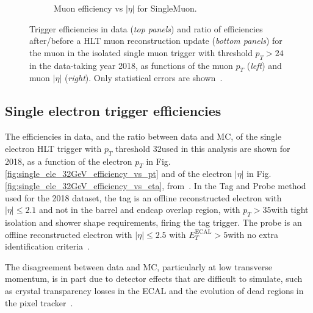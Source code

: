 \begin{figure}[ht]
\begin{subfigure}{0.45\textwidth}
        \caption{Muon efficiency vs $|\eta|$ for SingleMuon.}
        \label{fig:single_muon_24GeV_efficiency_vs_eta}
    \end{subfigure}
    \caption[Trigger efficiencies in data (\textit{top panels}) and ratio of efficiencies after/before a HLT muon reconstruction update (\textit{bottom panels}) for the muon in the isolated single muon trigger with threshold $p_{T} > 24$\GeV in the data-taking year 2018, as functions of the muon $p_{T}$ (\textit{left}) and muon $|\eta|$ (\textit{right}).]{Trigger efficiencies in data (\textit{top panels}) and ratio of efficiencies after/before a HLT muon reconstruction update (\textit{bottom panels}) for the muon in the isolated single muon trigger with threshold $p_{T} > 24$\GeV in the data-taking year 2018, as functions of the muon $p_{T}$ (\textit{left}) and muon $|\eta|$ (\textit{right}). Only statistical errors are shown~\cite{CMS-DP-2018-034}.} 
\end{figure}

\subsection{Single electron trigger efficiencies}

The efficiencies in data, and the ratio between data and MC, of the single electron HLT trigger with $p_{T}$ threshold 32\GeV used in this analysis are shown for 2018, as a function of the electron $p_{T}$ in Fig. \ref{fig:single_ele_32GeV_efficiency_vs_pt} and of the electron $|\eta|$ in Fig. \ref{fig:single_ele_32GeV_efficiency_vs_eta}, from~\cite{CMS-DP-2020-016}. In the Tag and Probe method used for the 2018 dataset, the tag is an offline reconstructed electron with $|\eta| \leq 2.1$ and not in the barrel and endcap overlap region, with $p_{T} > 35$\GeV with tight isolation and shower shape requirements, firing the tag trigger. The probe is an offline reconstructed electron with $|\eta| \leq 2.5$ with $E_T^\text{ECAL} > 5$\GeV with no extra identification criteria~\cite{CMS-DP-2020-016}. 

The disagreement between data and MC, particularly at low transverse momentum, is in part due to detector effects that are difficult to simulate, such as crystal transparency losses in the ECAL and the evolution of dead regions in the pixel tracker~\cite{CMS-DP-2020-016}.

